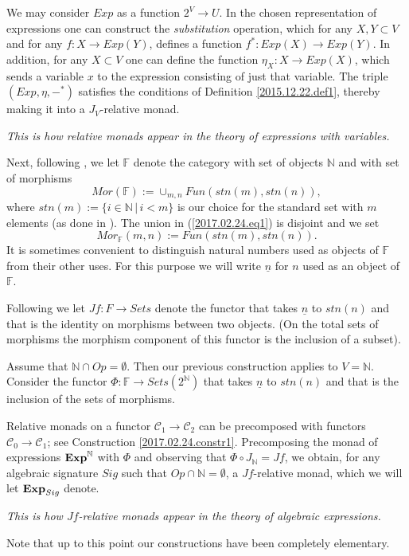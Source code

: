 \documentclass[onecolumn,12pt]{amsart}
\numberwithin{proposition}{subsection}
\newcommand{\sr}{\rightarrow}
\newcommand{\nn}{{\mathbb N}}
\newcommand{\nat}{\nn}
\newcommand{\uu}{\underline}
\newcommand{\mbind}[1]{{#1^*}}
\newcommand{\C}{{\mathcal C}}
\newcommand{\FF}{{\mathbb F}}
\newcommand{\ff}[1]{\uu{#1}}
\begin{document}
We may consider $Exp$ as a function $2^V\sr U$. In the chosen representation of
expressions one can construct the {\em substitution} operation, which for any
$X,Y\subset V$ and for any $f:X\sr Exp(Y)$, defines a function $\mbind{f}:Exp(X)\sr Exp(Y)$.
In addition, for any $X\subset V$ one can define the function
$\eta_{X}:X\sr Exp(X)$, which sends a variable $x$ to the expression consisting of
just that variable.
The triple $(Exp,\eta,\mbind{-})$ satisfies the
conditions of Definition \ref{2015.12.22.def1}, thereby making it into a $J_V$-relative
monad.

{\em This is how relative monads appear in the theory of expressions with variables.}

Next, following \cite{FPT}, we let $\FF$ denote the category with set of
objects $\nat$ and with set of morphisms
%
\begin{equation}
\label{2017.02.24.eq1}
Mor(\FF):=\cup_{m,n}Fun(stn(m),stn(n)),
\end{equation}%
%
where $stn(m):=\{i\in\nat\,|\,i<m\}$ is our choice for the standard set with $m$
elements (as done in \cite{LandC}).
The union in (\ref{2017.02.24.eq1}) is disjoint and we set
%
$$Mor_{\FF}(m,n):=Fun(stn(m),stn(n)).$$
%
It is sometimes convenient to distinguish natural numbers used as objects of
$\FF$ from their other uses. For this purpose we will write $\ff{n}$ for $n$
used as an object of $\FF$.

Following \cite{ACU} we let $Jf:F\sr Sets$ denote the functor that takes $\ff n$ to
$stn(n)$ and that is the identity on morphisms between two objects.  (On the
total sets of morphisms the morphism component of this functor is the inclusion
of a subset).

Assume that $\nat\cap Op=\emptyset$. Then our previous construction applies to
$V=\nat$. Consider the functor $\Phi:\FF\sr Sets(2^{\nat})$ that takes $\ff{n}$
to $stn(n)$ and that is the inclusion of the sets of morphisms.

Relative monads on a functor $\C_1\sr \C_2$ can be precomposed with functors $\C_0\sr\C_1$; see Construction \ref{2017.02.24.constr1}. Precomposing the monad of expressions ${\bf Exp}^{\nat}$ with $\Phi$ and observing that $\Phi\circ J_{\nat}=Jf$, we obtain, for any algebraic signature $Sig$ such that $Op\cap \nat=\emptyset$, a $Jf$-relative monad, which we will let ${\bf Exp}_{Sig}$ denote. 

{\em This is how $Jf$-relative monads appear in the theory of algebraic expressions.} 

Note that up to this point our constructions have been completely elementary.
\end{document}
